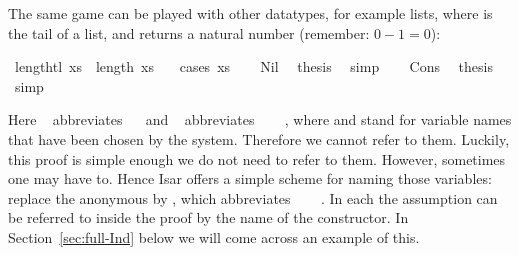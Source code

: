 \begin{isabellebody}
\begin{isamarkuptext}
The same game can be played with other datatypes, for example lists,
where  is the tail of a list, and  returns a
natural number (remember: $0-1=0$):%
\end{isamarkuptext}%
\isamarkuptrue%
\isamarkupfalse%
\ {}length{}tl\ xs{}\ {}\ length\ xs\ {}\ {}{}\isanewline
%
\isadelimproof
%
\endisadelimproof
%
\isatagproof
{}\isamarkupfalse%
\ {}cases\ xs{}\isanewline
\ \ \isamarkupfalse%
\ Nil\ \isamarkupfalse%
\ {}thesis\ \isamarkupfalse%
\ simp\isanewline
{}\isamarkupfalse%
\isanewline
\ \ \isamarkupfalse%
\ Cons\ \isamarkupfalse%
\ {}thesis\ \isamarkupfalse%
\ simp\isanewline
{}\isamarkupfalse%
%
\endisatagproof
{\isafoldproof}%
%
\isadelimproof
%
\endisadelimproof
%
\begin{isamarkuptext}%
\noindent Here ~ abbreviates
~~ and
~ abbreviates ~
~~,
where  and 
stand for variable names that have been chosen by the system.
Therefore we cannot refer to them.
Luckily, this proof is simple enough we do not need to refer to them.
However, sometimes one may have to. Hence Isar offers a simple scheme for
naming those variables: replace the anonymous  by
, which abbreviates ~
~~.
In each  the assumption can be
referred to inside the proof by the name of the constructor. In
Section~\ref{sec:full-Ind} below we will come across an example
of this.


\end{isamarkuptext}
\end{isabellebody}
